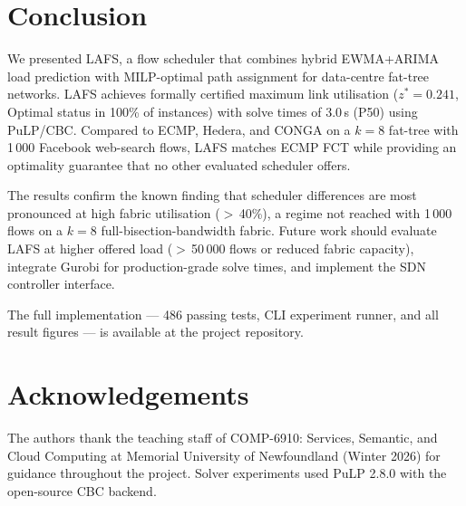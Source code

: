 \documentclass[runningheads]{llncs}
\begin{document}
\section{Conclusion}
\label{sec:conclusion}

We presented LAFS, a flow scheduler that combines hybrid EWMA+ARIMA load prediction with MILP-optimal path assignment for data-centre fat-tree networks. LAFS achieves formally certified maximum link utilisation ($z^* = 0.241$, Optimal status in 100\% of instances) with solve times of 3.0\,s (P50) using PuLP/CBC. Compared to ECMP, Hedera, and CONGA on a $k{=}8$ fat-tree with 1\,000 Facebook web-search flows, LAFS matches ECMP FCT while providing an optimality guarantee that no other evaluated scheduler offers.

The results confirm the known finding that scheduler differences are most pronounced at high fabric utilisation ($>$\,40\%), a regime not reached with 1\,000 flows on a $k{=}8$ full-bisection-bandwidth fabric. Future work should evaluate LAFS at higher offered load ($>$\,50\,000 flows or reduced fabric capacity), integrate Gurobi for production-grade solve times, and implement the SDN controller interface.

The full implementation — 486 passing tests, CLI experiment runner, and all result figures — is available at the project repository.

\section*{Acknowledgements}

The authors thank the teaching staff of COMP-6910: Services, Semantic, and Cloud Computing at Memorial University of Newfoundland (Winter 2026) for guidance throughout the project. Solver experiments used PuLP 2.8.0 with the open-source CBC backend.
\end{document}
